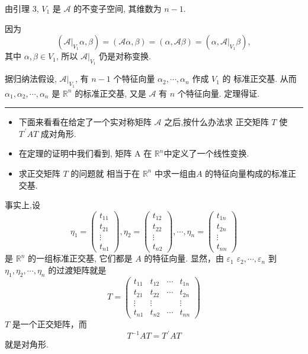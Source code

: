 \documentclass[13pt]{beamer}
\def\qed{\nopagebreak\hfill{\rule{4pt}{7pt}}\medbreak}
\def\Rn{\mathbb{R}^n}
\def\A{\mathscr{A}}
\def\a{\alpha}
\def\b{\beta}
\begin{document}
\begin{frame}
由引理 3, $V_{1}$ 是 $\mathscr{A}$ 的不变子空间, 其维数为 $n-1$.

因为$$(\A|_{V_{1}} {\a}, {\beta})=(\A {\a}, {\beta})=({\alpha}, \A {\beta})=({\alpha}, \A|_{V_{1}} {\beta}),$$ 其中 $\a, \b \in V_1$, 所以 $\A|_{V_{1}}$ 仍是对称变换.

据归纳法假设, $\A|_{V_{1}}$, 有 $n-1$ 个特征向量 ${\alpha}_{2}, \cdots, {\alpha}_{n}$ 作成 $V_{1}$ 的
标准正交基.
从而 ${\alpha}_{1}, {\alpha}_{2}, \cdots, {\alpha}_{n}$ 是 $\mathbb{R}^{n}$ 的标准正交基, 又是 $\mathscr{A}$ 有
$n$ 个特征向量. 定理得证. 
\qed
\begin{itemize}
\item  下面来看看在给定了一个实对称矩阵 $\A$ 之后,按什么办法求 正交矩阵 $T$ 使$T^{\, \prime}AT$ 成对角形. 
\item  在定理的证明中我们看到, 矩阵 A 在 $\Rn$中定义了一个线性变换.
\item  求正交矩阵 $T$ 的问题就 相当于在 $\Rn$ 中求一组由$A$ 的\alert{特征向量}构成的标准正交基.
\end{itemize}
\end{frame}


\begin{frame}


事实上,设
\[
\eta_{1}=\left(\begin{array}{c}
t_{11} \\
t_{21} \\
\vdots \\
t_{n 1}
\end{array}\right), \eta_{2}=\left(\begin{array}{c}
t_{12} \\
t_{22} \\
\vdots \\
t_{n 2}
\end{array}\right), \cdots, \eta_{n}=\left(\begin{array}{c}
t_{1 n} \\
t_{2 n} \\
\vdots \\
t_{n n}
\end{array}\right)
\]
是 $\Rn$ 的一组标准正交基, 它们都是 $A$ 的特征向量.
显然，由 ${\varepsilon}_{1}$
${\varepsilon}_{2}, \cdots, {\varepsilon}_{n}$ 到 ${\eta}_{1}, {\eta}_{2}, \cdots, {\eta}_{n}$ 的\alert{过渡矩阵}就是
\[
{T}=\left(\begin{array}{cccc}
t_{11} & t_{12} & \cdots & t_{1 n} \\
t_{21} & t_{22} & \cdots & t_{2 n} \\
\vdots & \vdots & & \vdots \\
t_{n 1} & t_{n 2} & \cdots & t_{n n}
\end{array}\right)
\]
$T$ 是一个正交矩阵，而
\[
{T}^{-1} {A} {T}={T}^{\, \prime} {A} {T}
\]
就是对角形.
\end{frame}
\end{document}

